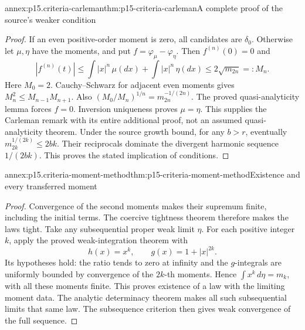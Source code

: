 \begin{annexitem}{annex:p15.criteria-carleman}{thm:p15-criteria-carleman}{A complete proof of the source's weaker condition}
\begin{proof}
If an even positive-order moment is zero,
all candidates are \(\delta_0\).
Otherwise let \(\mu,\eta\) have the moments,
and put \(f=\varphi_\mu-\varphi_\eta\).
Then \(f^{(n)}(0)=0\) and
\[
 |f^{(n)}(t)|
 \leq\int|x|^n\,\mu(dx)+\int|x|^n\,\eta(dx)
                      \leq2\sqrt{m_{2n}}=:M_n.
\]
Here \(M_0=2\).
Cauchy--Schwarz for adjacent even moments
gives \(M_n^2\leq M_{n-1}M_{n+1}\).
Also \((M_0/M_n)^{1/n}=m_{2n}^{-1/(2n)}\).
The proved quasi-analyticity lemma forces \(f=0\).
Inversion uniqueness proves \(\mu=\eta\).
This supplies the Carleman remark with its
entire additional proof, not an assumed
quasi-analyticity theorem.
Under the source growth bound, for any \(b>r\),
eventually \(m_{2k}^{1/(2k)}\leq2bk\).
Their reciprocals dominate the divergent
harmonic sequence \(1/(2bk)\).
This proves the stated implication of conditions.
\end{proof}
\end{annexitem}

\begin{annexitem}{annex:p15.criteria-moment-method}{thm:p15-criteria-moment-method}{Existence and every transferred moment}
\begin{proof}
Convergence of the second moments makes their
supremum finite, including the initial terms.
The coercive tightness theorem therefore
makes the laws tight.
Take any subsequential proper weak limit \(\eta\).
For each positive integer \(k\), apply
the proved weak-integration theorem with
\[
 h(x)=x^k,\qquad g(x)=1+|x|^{2k}.
\]
Its hypotheses hold: the ratio tends to zero
at infinity and the \(g\)-integrals are uniformly
bounded by convergence of the \(2k\)-th moments.
Hence \(\int x^k\,d\eta=m_k\), with all these
moments finite.
This proves existence of a law with the
limiting moment data. The analytic determinacy
theorem makes all such subsequential limits
that same law. The subsequence criterion
then gives weak convergence of the full sequence.
\end{proof}
\end{annexitem}

